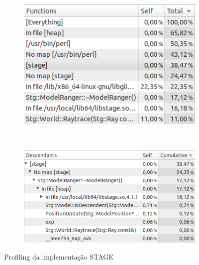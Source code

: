 \documentclass[
	12pt,				%
	openright,			%
	oneside,			%
	a4paper,			%
	english,			%
	french,				%
	spanish,			%
	brazil,				%
	]{abntex2}
\begin{document}
\begin{figure}[h!]
    \centering
    \begin{subfigure}[b]{0.48\textwidth}
        \includegraphics[width=\textwidth]{figs/sysprof_overview_stage}
        \caption{}
        \label{fig:sysprof_overview_stage}
    \end{subfigure}
    ~ %
    \begin{subfigure}[b]{0.48\textwidth}
        \includegraphics[width=\textwidth]{figs/sysprof_stage}
        \caption{}
        \label{fig:sysprof_stage}
    \end{subfigure}
    \caption{Profiling da implementação STAGE}
    \label{fig:sysprof_impl_stage}
\end{figure}
\end{document}
